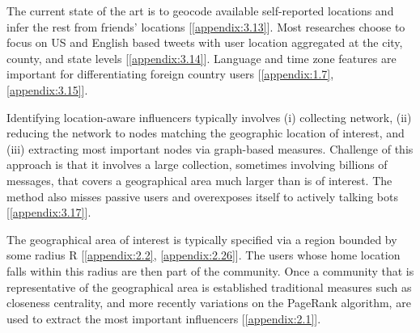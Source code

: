 The current state of the art is to geocode available self-reported locations and infer the rest from friends' locations [\ref{appendix:3.13}]. Most researches choose to focus on US and English based tweets with user location aggregated at the city, county, and state levels [\ref{appendix:3.14}]. Language and time zone features are important for differentiating foreign country users [\ref{appendix:1.7}, \ref{appendix:3.15}]. 

Identifying location-aware influencers typically involves (i) collecting network, (ii) reducing the network to nodes matching the geographic location of interest, and (iii) extracting most important nodes via graph-based measures. %
Challenge of this approach is that it involves a large collection, sometimes involving billions of messages, that covers a geographical area much larger than is of interest. The method also misses passive users and overexposes itself to actively talking bots [\ref{appendix:3.17}]. %

The geographical area of interest is typically specified via a region bounded by some radius R [\ref{appendix:2.2}, \ref{appendix:2.26}]. The users whose home location falls within this radius are then part of the community. Once a community that is representative of the geographical area is established traditional measures such as closeness centrality, and more recently variations on the PageRank algorithm, are used to extract the most important influencers [\ref{appendix:2.1}]. %
 
